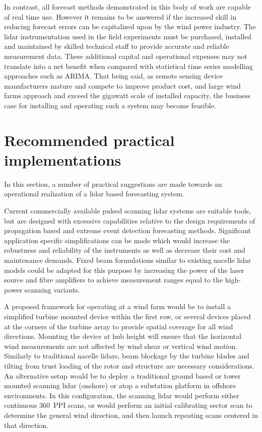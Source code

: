 In contrast, all forecast methods demonstrated in this body of work are capable of real time use. However it remains to be answered if the increased skill in reducing forecast errors can be capitalized upon by the wind power industry. The lidar instrumentation used in the field experiments must be purchased, installed and maintained by skilled technical staff to provide accurate and reliable measurement data. These additional capital and operational expenses may not translate into a net benefit when compared with statistical time series modelling approaches such as ARIMA. That being said, as remote sensing device manufacturers mature and compete to improve product cost, and large wind farms approach and exceed the gigawatt scale of installed capacity, the business case for installing and operating such a system may become feasible.


\clearpage
\section{Recommended practical implementations}
\label{sec:discussion_practical}

In this section, a number of practical suggestions are made towards an operational realization of a lidar based forecasting system.

Current commercially available pulsed scanning lidar systems are suitable tools, but are designed with excessive capabilities relative to the design requirements of propagation based and extreme event detection forecasting methods. Significant application specific simplifications can be made which would increase the robustness and reliability of the instruments as well as decrease their cost and maintenance demands. Fixed beam formulations similar to existing nacelle lidar models could be adapted for this purpose by increasing the power of the laser source and fibre amplifiers to achieve measurement ranges equal to the high-power scanning variants. 

A proposed framework for operating at a wind farm would be to install a simplified turbine mounted device within the first row, or several devices placed at the corners of the turbine array to provide spatial coverage for all wind directions. Mounting the device at hub height will ensure that the horizontal wind measurements are not affected by wind shear or vertical wind motion. Similarly to traditional nacelle lidars, beam blockage by the turbine blades and tilting from trust loading of the rotor and structure are necessary considerations. An alternative setup would be to deploy a traditional ground based or tower mounted scanning lidar (onshore) or atop a substation platform in offshore environments. In this configuration, the scanning lidar would perform either continuous 360\degree \ PPI scans, or would perform an initial calibrating sector scan to determine the general wind direction, and then launch repeating scans centered in that direction. 


